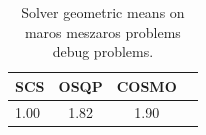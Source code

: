 \begin{table}
\centering
\caption{Solver geometric means on maros meszaros problems debug problems.}
\label{t-maros meszaros problems debug-geom_mean}
\begin{tabular}{lccc}
\toprule
 SCS &  OSQP &  COSMO \\
\midrule
1.00 &  1.82 &   1.90 \\
\bottomrule
\end{tabular}
\end{table}
